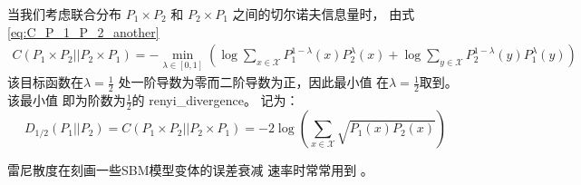 当我们考虑联合分布 $P_1 \times P_2$
和 $P_2 \times P_1$ 之间的切尔诺夫信息量时，
由式 \eqref{eq:C_P_1_P_2_another}
\begin{align*}
  C(P_1 \times P_2||P_2 \times P_1) 
  = -\min_{\lambda \in [0,1]}
  \left(\log \sum_{x\in \mathcal{X}}
  P_1^{1-\lambda}(x) P_2^{\lambda}(x) 
  +\log \sum_{y\in \mathcal{X}}
  P_2^{1-\lambda}(y) P_1^{\lambda}(y) 
  \right)
  \end{align*}
该目标函数在$\lambda=\frac{1}{2}$
处一阶导数为零而二阶导数为正，因此最小值
在$\lambda=\frac{1}{2}$取到。该最小值
即为阶数为$\frac{1}{2}$的 \gls{renyi_divergence}。
记为：
\begin{equation}\label{eq:renyi_divergence}
  D_{1/2}(P_1 || P_2) = C(P_1 \times P_2||P_2 \times P_1)=
  -2\log \left(\sum_{x \in \mathcal{X}}
  \sqrt{P_1(x)P_2(x)} \right)
\end{equation}

雷尼散度在刻画一些SBM模型变体的误差衰减
速率时常常用到 \cite{zhang2016}。

